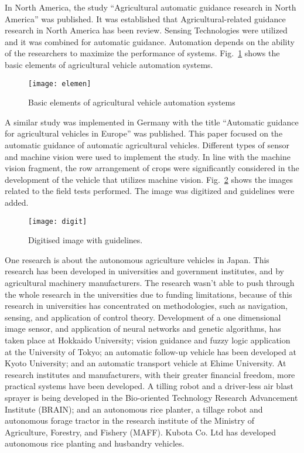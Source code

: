 In North America, the study “Agricultural automatic guidance research in North America” was published. It was established that Agricultural-related guidance research in North America has been review. Sensing Technologies were utilized and it was combined for automatic guidance. Automation depends on the ability of the researchers to maximize the performance of systems. Fig.~\ref{fig:elemen} shows the basic elements of agricultural vehicle automation systems.

\begin{figure}[!h]
	\centering
	\texttt{[image: elemen]}
	\caption{Basic elements of agricultural vehicle automation systems}
	\label{fig:elemen}
\end{figure}

A similar study was implemented in Germany with the title “Automatic guidance for agricultural vehicles in Europe” was published. This paper focused on the automatic guidance of automatic agricultural vehicles. Different types of sensor and machine vision were used to implement the study. In line with the machine vision fragment, the row arrangement of crops were significantly considered in the development of the vehicle that utilizes machine vision. Fig.~\ref{fig:digit} shows the images related to the field tests performed. The image was digitized and guidelines were added.

\begin{figure}[!h]
	\centering
	\texttt{[image: digit]}
	\caption{Digitised image with guidelines.}
	\label{fig:digit}
\end{figure}

One research is about the autonomous agriculture vehicles in Japan. This research has been developed in universities and government institutes, and by agricultural machinery manufacturers. The research wasn’t able to push through the whole research in the universities due to funding limitations, because of this research in universities has concentrated on methodologies, such as navigation, sensing, and application of control theory. Development of a one dimensional image sensor, and application of neural networks and genetic algorithms, has taken place at Hokkaido University; vision guidance and fuzzy logic application at the University of Tokyo; an automatic follow-up vehicle has been developed at Kyoto University; and an automatic transport vehicle at Ehime University. At research institutes and manufacturers, with their greater financial freedom, more practical systems have been developed. A tilling robot and a driver-less air blast sprayer is being developed in the Bio-oriented Technology Research Advancement Institute (BRAIN); and an autonomous rice planter, a tillage robot and autonomous forage tractor in the research institute of the Ministry of Agriculture, Forestry, and Fishery (MAFF). Kubota Co. Ltd has developed autonomous rice planting and husbandry vehicles. 

